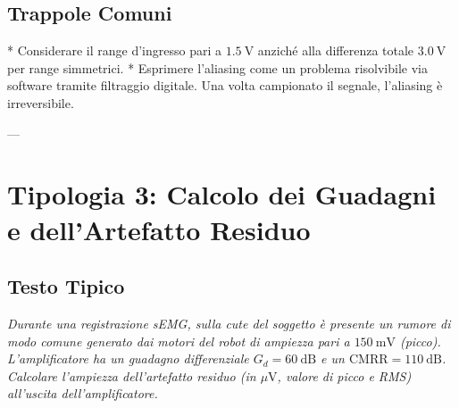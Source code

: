 \documentclass[10pt, letterpaper]{report}
\begin{document}
\subsection*{Trappole Comuni}
* Considerare il range d'ingresso pari a $1.5\ \text{V}$ anziché alla differenza totale $3.0\ \text{V}$ per range simmetrici.
* Esprimere l'aliasing come un problema risolvibile via software tramite filtraggio digitale. Una volta campionato il segnale, l'aliasing è irreversibile.

---

\section{Tipologia 3: Calcolo dei Guadagni e dell'Artefatto Residuo}

\subsection*{Testo Tipico}
\emph{Durante una registrazione sEMG, sulla cute del soggetto è presente un rumore di modo comune generato dai motori del robot di ampiezza pari a $150\ \text{mV}$ (picco).
L'amplificatore ha un guadagno differenziale $G_d = 60\ \text{dB}$ e un $\text{CMRR} = 110\ \text{dB}$.
Calcolare l'ampiezza dell'artefatto residuo (in $\mu\text{V}$, valore di picco e RMS) all'uscita dell'amplificatore.}
\end{document}
